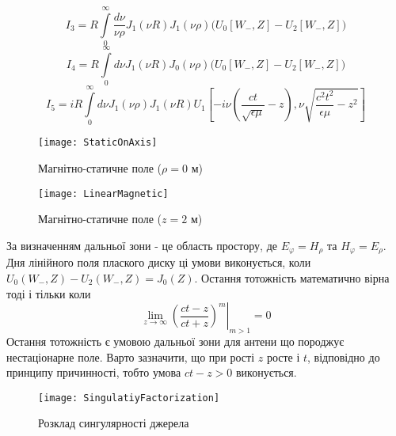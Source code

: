 %
\begin{equation*}
I_3 = R \int \limits_{0}^{\infty}
\frac{d\nu}{\nu \rho} J_1(\nu R) J_1(\nu \rho)
\Big( U_0[ W_-, Z ] - U_2[ W_-, Z ] \Big) 
\end{equation*}
%
\begin{equation*}
I_4 = R \int \limits_{0}^{\infty} d\nu J_1(\nu R) J_0(\nu \rho)
\Big( U_0[ W_-, Z ] - U_2[ W_-, Z ] \Big) 
\end{equation*}
%
\begin{equation*}
I_5 = i R \int \limits_0^\infty 
d \nu J_1(\nu \rho) J_1 (\nu R)
U_1 \left[ -i \nu \left( \frac{ct}{\sqrt{\epsilon \mu}} - z \right), 
\nu \sqrt{\frac{c^2t^2}{\epsilon \mu}-z^2} \right]
\end{equation*}
%
\begin{figure}[h] \begin{center}
\texttt{[image: StaticOnAxis]}
\caption{Магнітно-статичне поле ($ \rho = 0 $ м)} \label{fig:emp_h_rho}
\end{center} \end{figure}
%
\begin{figure}[h] \begin{center}
\texttt{[image: LinearMagnetic]}
\caption{Магнітно-статичне поле ($ z = 2 $ м)} \label{fig:emp_h_rho}
\end{center} \end{figure}

За визначенням дальньої зони - це область простору, де $ E_\varphi = H_\rho $ та
$ H_\varphi = E_\rho $. Дня лінійного поля плаского диску ці умови виконується, 
коли $ U_0(W_-,Z) - U_2(W_-,Z) = J_0(Z) $. Остання тотожність математично вірна
тоді і тільки коли 
%
\begin{equation} \label{eq:FraunhoferDistance}
\left. \lim_{z \to \infty} \left( \frac{ct-z}{ct+z} \right)^m 
\right|_{m > 1} = 0
\end{equation}
%
Остання тотожність є умовою дальньої зони для антени що породжує 
нестаціонарне поле. Варто зазначити, що при рості $ z $ росте і $ t $, 
відповідно до принципу причинності, тобто умова $ ct - z > 0 $ виконується.
%
\begin{figure}[h] \begin{center}
\texttt{[image: SingulatiyFactorization]}
\caption{Розклад сингулярності джерела} \label{fig:singulatiy_factorization}
\end{center} \end{figure}


